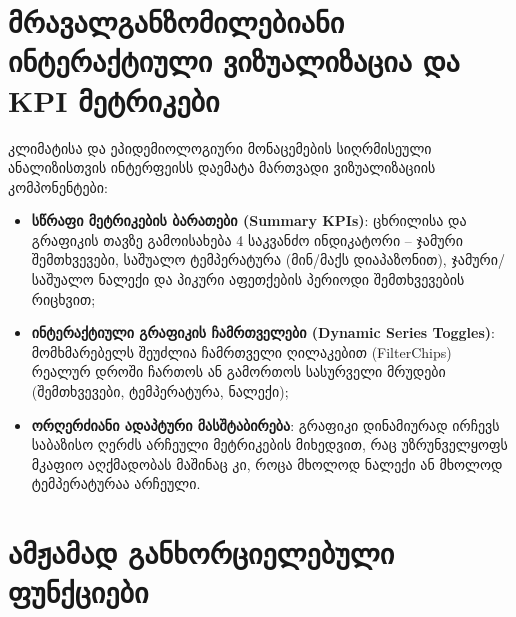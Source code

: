 \documentclass[11pt,a4paper]{article}
\begin{document}
\section{მრავალგანზომილებიანი ინტერაქტიული ვიზუალიზაცია და KPI მეტრიკები}
\label{sec:interactive-visualization}

კლიმატისა და ეპიდემიოლოგიური მონაცემების სიღრმისეული ანალიზისთვის
ინტერფეისს დაემატა მართვადი ვიზუალიზაციის კომპონენტები:
\begin{itemize}[leftmargin=1.4em]
  \item \textbf{სწრაფი მეტრიკების ბარათები (Summary KPIs)}: ცხრილისა და
    გრაფიკის თავზე გამოისახება 4 საკვანძო ინდიკატორი -- ჯამური შემთხვევები,
    საშუალო ტემპერატურა (მინ/მაქს დიაპაზონით), ჯამური/საშუალო ნალექი და
    პიკური აფეთქების პერიოდი შემთხვევების რიცხვით;
  \item \textbf{ინტერაქტიული გრაფიკის ჩამრთველები (Dynamic Series Toggles)}:
    მომხმარებელს შეუძლია ჩამრთველი ღილაკებით (FilterChips) რეალურ დროში
    ჩართოს ან გამორთოს სასურველი მრუდები (შემთხვევები, ტემპერატურა, ნალექი);
  \item \textbf{ორღერძიანი ადაპტური მასშტაბირება}: გრაფიკი დინამიურად
    ირჩევს საბაზისო ღერძს არჩეული მეტრიკების მიხედვით, რაც უზრუნველყოფს
    მკაფიო აღქმადობას მაშინაც კი, როცა მხოლოდ ნალექი ან მხოლოდ ტემპერატურაა
    არჩეული.
\end{itemize}

\section{ამჟამად განხორციელებული ფუნქციები}
\end{document}
